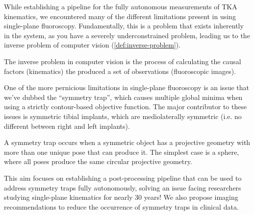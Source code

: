 While establishing a pipeline for the fully autonomous measurements of TKA kinematics, we encountered many of the different limitations present in using single-plane fluoroscopy. Fundamentally, this is a problem that exists inherently in the system, as you have a severely underconstrained problem, leading us to the inverse problem of computer vision (\cref{def:inverse-problem}).

\begin{mdframed}
    \begin{definition}
        The inverse problem in computer vision is the process of calculating the causal factors (kinematics) the produced a set of observations (fluoroscopic images).
        \label{def:inverse-problem}
    \end{definition}
\end{mdframed}

One of the more pernicious limitations in single-plane fluoroscopy is an issue that we've dubbed the ``symmetry trap'', which causes multiple global minima when using a strictly contour-based objective function. The major contributor to these issues is symmetric tibial implants, which are mediolaterally symmetric (i.e. no different between right and left implants).

\begin{mdframed}
    \begin{definition}
        A symmetry trap occurs when a symmetric object has a projective geometry with more than one unique pose that can produce it. The simplest case is a sphere, where all poses produce the same circular projective geometry.
    \end{definition}
\end{mdframed}

This aim focuses on establishing a post-processing pipeline that can be used to address symmetry traps fully autonomously, solving an issue facing researchers studying single-plane kinematics for nearly 30 years! We also propose imaging recommendations to reduce the occurrence of symmetry traps in clinical data.

